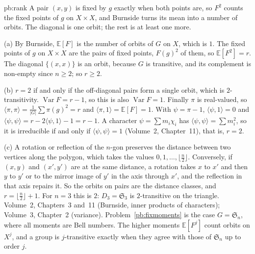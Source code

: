 \begin{solution}{pb:rank}
\idea A pair $(x,y)$ is fixed by $g$ exactly when both points are, so $F^2$ counts the fixed points of $g$ on $X\times X$, and
Burnside turns its mean into a number of orbits. The diagonal is one orbit; the rest is at least one more.

\writeup (a) By Burnside, $\mathbb E[F]$ is the number of orbits of $G$ on $X$, which is $1$. The fixed points of $g$ on $X\times X$
are the pairs of fixed points, $F(g)^2$ of them, so $\mathbb E[F^2]=r$. The diagonal $\{(x,x)\}$ is an orbit, because $G$ is
transitive, and its complement is non-empty since $n\ge2$; so $r\ge2$.

(b) $r=2$ if and only if the off-diagonal pairs form a single orbit, which is $2$-transitivity. $\operatorname{Var}F=r-1$, so
this is also $\operatorname{Var}F=1$. Finally $\pi$ is real-valued, so $\langle\pi,\pi\rangle=\frac1{|G|}\sum\pi(g)^2=r$ and
$\langle\pi,1\rangle=\mathbb E[F]=1$. With $\psi=\pi-1$, $\langle\psi,1\rangle=0$ and $\langle\psi,\psi\rangle=r-2\langle\psi,1\rangle-1=r-1$.
A character $\psi=\sum m_i\chi_i$ has $\langle\psi,\psi\rangle=\sum m_i^2$, so it is irreducible if and only if
$\langle\psi,\psi\rangle=1$ (Volume~2, Chapter~11), that is, $r=2$.

(c) A rotation or reflection of the $n$-gon preserves the distance between two vertices along the polygon, which takes the
values $0,1,\dots,\lfloor\frac n2\rfloor$. Conversely, if $(x,y)$ and $(x',y')$ are at the same distance, a rotation takes $x$ to $x'$
and then $y$ to $y'$ or to the mirror image of $y'$ in the axis through $x'$, and the reflection in that axis repairs it. So
the orbits on pairs are the distance classes, and $r=\lfloor\frac n2\rfloor+1$. For $n=3$ this is $2$: $D_3=\mathfrak S_3$ is
$2$-transitive on the triangle.
\tools Volume~2, Chapters~3 and~11 (Burnside, inner products of characters); Volume~3, Chapter~2 (variance).
\leads Problem~\ref{pb:fixmoments} is the case $G=\mathfrak S_n$, where all moments are Bell numbers. The higher moments
$\mathbb E[F^j]$ count orbits on $X^j$, and a group is $j$-transitive exactly when they agree with those of $\mathfrak S_n$ up to
order $j$.
\end{solution}

